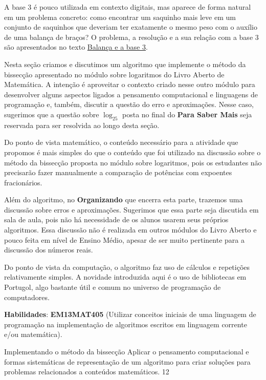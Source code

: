A base 3 é pouco utilizada em contexto digitais, mas aparece de forma natural em um problema concreto: como encontrar um saquinho mais leve em um conjunto de saquinhos que deveriam ter exatamente o mesmo peso com o auxílio de uma balança de braços? O problema, a resolução e a sua relação com a base 3 são apresentados no texto \href{http://rpm.org.br/cdrpm/79/4.html}{Balança e a base 3}.


\label{comp-exp7}
\def\currentcolor{session1}
\begin{texto}
{
Nesta seção criamos e discutimos um algoritmo que implemente o método da bissecção apresentado no módulo sobre logaritmos do Livro Aberto de Matemática. A intenção é aproveitar o contexto criado nesse outro módulo para desenvolver alguns aspectos ligados a pensamento computacional e linguagens de programação e, também, discutir a questão do erro e aproximações. Nesse caso, sugerimos que a questão sobre $\log_25$ posta no final do \textbf{Para Saber Mais} seja reservada para ser resolvida ao longo desta seção.

Do ponto de vista matemático, o conteúdo necessário para a atividade que propomos é mais simples do que o conteúdo que foi utilizado na discussão sobre o método da bissecção proposta no módulo sobre logaritmos, pois os estudantes não precisarão fazer manualmente a comparação de potências com expoentes fracionários.

Além do algoritmo, no \textbf{Organizando} que encerra esta parte, trazemos uma discussão sobre erros e aproximações. Sugerimos que essa parte seja discutida em sala de aula, pois não há necessidade de os alunos usarem seus próprios algoritmos. Essa discussão não é realizada em outros módulos do Livro Aberto e pouco feita em nível de Ensino Médio, apesar de ser muito pertinente para a discussão dos números reais.

Do ponto de vista da computação, o algoritmo faz uso de cálculos e repetições relativamente simples. A novidade introduzida aqui é o uso de bibliotecas em Portugol, algo bastante útil e comum no universo de programação de computadores.

\textbf{Habilidades}: \textbf{EM13MAT405} (Utilizar conceitos iniciais de uma linguagem de programação na implementação de algoritmos escritos em linguagem corrente e/ou matemática).
}
\end{texto}
\clearmargin
\begin{objectives}{Implementando o método da bissecção}
{
Aplicar o pensamento computacional e formas sistemáticas de representação de um algoritmo para criar soluções para problemas relacionados a conteúdos matemáticos.
}{1}{2}
\end{objectives}
